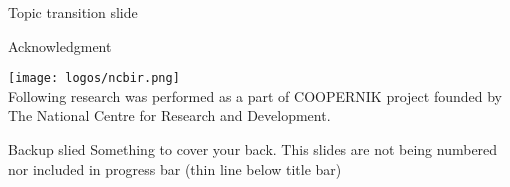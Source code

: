 \documentclass{beamer}
\begin{document}
\begin{frame}[standout]
    Topic transition slide
\end{frame}


\begin{frame}{Acknowledgment}
\begin{center}
\texttt{[image: logos/ncbir.png]} \\
Following research was performed as a part of COOPERNIK project founded by The National Centre for Research and Development.
\end{center}
\end{frame}



\appendix

\begin{frame}{Backup slied}
    Something to cover your back. This slides are not being numbered nor included in progress bar (thin line below title bar)
\end{frame}
\end{document}
